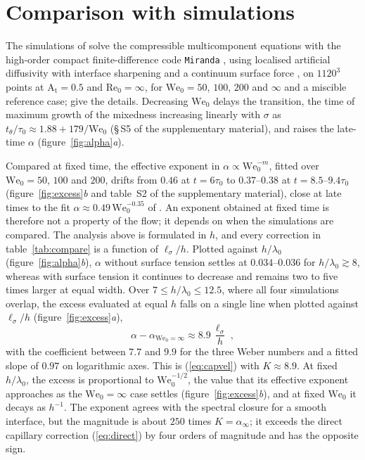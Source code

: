 \documentclass[lineno]{jfm}
\newcommand{\At}{\mathrm{A_t}}
\newcommand{\We}{\mathrm{We}_0}
\newcommand{\lls}{\ell_\sigma}
\begin{document}
\section{Comparison with simulations}\label{sec:sims}

The simulations of \citet{Walker2025,Walker2026,Walker2027_1} solve the compressible multicomponent equations with the high-order compact finite-difference code \texttt{Miranda} \citep{Cook2007}, using localised artificial diffusivity with interface sharpening \citep{Brill2025} and a continuum surface force \citep{Brackbill1992}, on $1120^3$ points at $\At = 0.5$ and $\mathrm{Re}_0 = \infty$, for $\We = 50$, $100$, $200$ and $\infty$ and a miscible reference case; \citet{Walker2027_1} give the details. Decreasing $\We$ delays the transition, the time of maximum growth of the mixedness increasing linearly with $\sigma$ as $t_\theta/\tau_0 \approx 1.88 + 179/\We$ (\S\,S5 of the supplementary material), and raises the late-time $\alpha$ (figure~\ref{fig:alpha}\textit{a}).

Compared at fixed time, the effective exponent in $\alpha \propto \We^{-m}$, fitted over $\We = 50$, $100$ and $200$, drifts from $0.46$ at $t = 6 \tau_0$ to $0.37$--$0.38$ at $t = 8.5$--$9.4 \tau_0$ (figure~\ref{fig:excess}\textit{b} and table~S2 of the supplementary material), close at late times to the fit $\alpha \approx 0.49 \, \We^{-0.35}$ of \citet{Walker2026}. An exponent obtained at fixed time is therefore not a property of the flow; it depends on when the simulations are compared. The analysis above is formulated in $h$, and every correction in table~\ref{tab:compare} is a function of $\lls/h$. Plotted against $h/\lambda_0$ (figure~\ref{fig:alpha}\textit{b}), $\alpha$ without surface tension settles at $0.034$--$0.036$ for $h/\lambda_0 \gtrsim 8$, whereas with surface tension it continues to decrease and remains two to five times larger at equal width. Over $7 \le h/\lambda_0 \le 12.5$, where all four simulations overlap, the excess evaluated at equal $h$ falls on a single line when plotted against $\lls/h$ (figure~\ref{fig:excess}\textit{a}),
\begin{equation}
  \alpha - \alpha_{\We = \infty} \approx 8.9 \, \frac{\lls}{h} \;,
  \label{eq:fit}
\end{equation}
with the coefficient between $7.7$ and $9.9$ for the three Weber numbers and a fitted slope of $0.97$ on logarithmic axes. This is (\ref{eq:capvel}) with $K \approx 8.9$. At fixed $h/\lambda_0$, the excess is proportional to $\We^{-1/2}$, the value that its effective exponent approaches as the $\We = \infty$ case settles (figure~\ref{fig:excess}\textit{b}), and at fixed $\We$ it decays as $h^{-1}$. The exponent agrees with the spectral closure for a smooth interface, but the magnitude is about $250$ times $K = \alpha_\infty$; it exceeds the direct capillary correction (\ref{eq:direct}) by four orders of magnitude and has the opposite sign.
\end{document}
